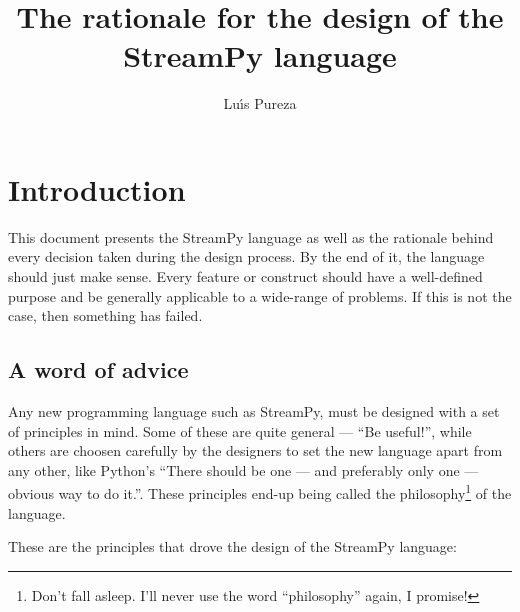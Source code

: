 \documentclass[twoside]{report}
\begin{document}
\title{The rationale for the design of the StreamPy language}
\author{Lu\'{\i}s Pureza}

\maketitle

\chapter{Introduction}
This document presents the StreamPy language as well as the rationale behind every decision taken during the design process. By the end of it, the language should just make sense. Every feature or construct should have a well-defined purpose and be generally applicable to a wide-range of problems. If this is not the case, then something has failed.

\section{A word of advice}
Any new programming language such as StreamPy, must be designed with a set of principles in mind. Some of these are quite general --- ``Be useful!'', while others are choosen carefully by the designers to set the new language apart from any other, like Python's ``There should be one --- and preferably only one --- obvious way to do it.''. These principles end-up being called the philosophy\footnote{Don't fall asleep. I'll never use the word ``philosophy'' again, I promise!} of the language.

These are the principles that drove the design of the StreamPy language:
\end{document}

